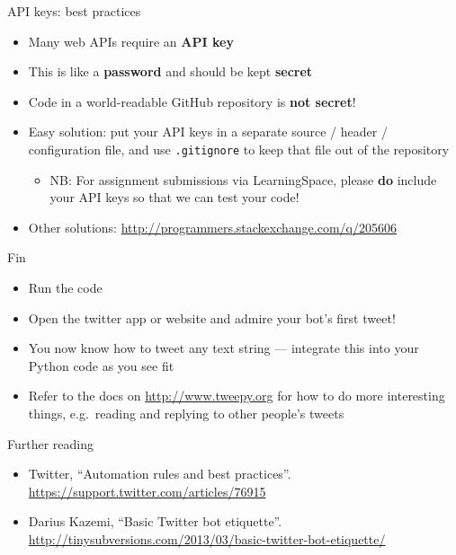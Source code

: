 \begin{frame}{API keys: best practices}
    \begin{itemize}
        \item Many web APIs require an \textbf{API key} \pause
        \item This is like a \textbf{password} and should be kept \textbf{secret} \pause
        \item Code in a world-readable GitHub repository is \textbf{not secret}! \pause
        \item Easy solution: put your API keys in a separate source / header / configuration file,
            and use \texttt{.gitignore} to keep that file out of the repository \pause
                \begin{itemize}
                    \item NB: For assignment submissions via LearningSpace,
                        please \textbf{do} include your API keys so that we can test your code! \pause
                \end{itemize}
        \item Other solutions:
            \url{http://programmers.stackexchange.com/q/205606}
    \end{itemize}
\end{frame}

\begin{frame}{Fin}
    \begin{itemize}
        \item Run the code
        \item Open the twitter app or website and admire your bot's first tweet! \pause
        \item You now know how to tweet any text string --- integrate this into your Python code as you see fit
        \item Refer to the docs on \url{http://www.tweepy.org}
            for how to do more interesting things, e.g.\ reading and replying to other people's tweets
    \end{itemize}
\end{frame}

\begin{frame}{Further reading}
    \begin{itemize}
        \item Twitter, ``Automation rules and best practices''.
            \url{https://support.twitter.com/articles/76915}
        \item Darius Kazemi, ``Basic Twitter bot etiquette''.
            \url{http://tinysubversions.com/2013/03/basic-twitter-bot-etiquette/}
    \end{itemize}
\end{frame}



